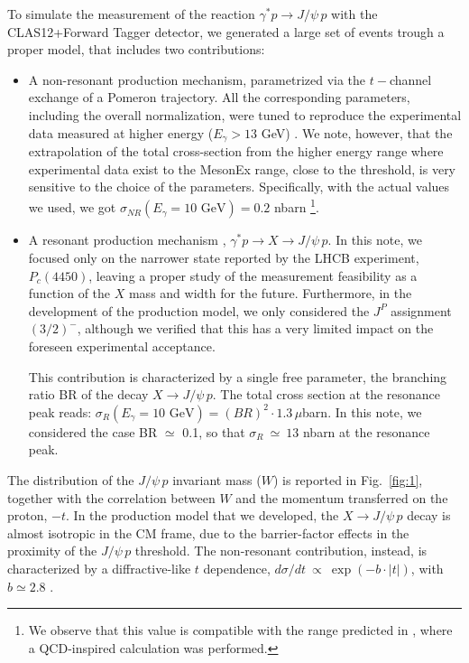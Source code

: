 To simulate the measurement of the reaction $\gamma^* p \rightarrow J/\psi \, p$ with the CLAS12+Forward Tagger detector, we generated a large set of events trough a proper model, that includes two contributions:
\begin{itemize}
\item{A non-resonant production mechanism, parametrized via the $t-$channel exchange of a Pomeron trajectory. All the corresponding parameters, including the overall normalization, were tuned to reproduce the experimental data measured at higher energy  ($E_{\gamma} > 13$ GeV) \cite{Camerini:1975cy}.
We note, however, that the extrapolation of the total cross-section from the higher energy range where experimental data exist to the MesonEx range, close to the threshold, is very sensitive to the choice of the parameters. 
Specifically, with the actual values we used, we got $\sigma_{NR}(E_{\gamma}=10 \mbox{ GeV} ) = 0.2 $ nbarn \footnote
{
We observe that this value is compatible with the range predicted in \cite{bchl}, where a QCD-inspired calculation was performed.}.
} 
\item{A resonant production mechanism  , $\gamma^* p \rightarrow X \rightarrow J/\psi \, p$. 
In this note, we focused only on the narrower state reported by the LHCB experiment, $P_c(4450)$, leaving a proper study of the measurement feasibility as a function of the $X$ mass and width for the future. 
Furthermore, in the development of the production model, we only considered the $J^P$ assignment $(3/2)^-$, although we verified that this has a very limited impact on the foreseen experimental acceptance. 

This contribution is characterized by a single free parameter, the branching ratio BR of the decay $X \rightarrow J/\psi \, p$. 
The total cross section at the resonance peak reads: $\sigma_{R}(E_{\gamma}=10 \mbox{ GeV} ) = (BR)^{2}\cdot 1.3 \, \mu$barn. 
In this note, we considered the case BR $\simeq$ 0.1, so that $\sigma_{R}~\simeq~ 13$ nbarn at the resonance peak.}
\end{itemize}

The distribution of the  $J/\psi \, p$ invariant mass ($W$) is reported in Fig.~\ref{fig:1}, together with the correlation between $W$ and the momentum transferred on the proton, $-t$. 
In the production model that we developed, the $X\rightarrow J/\psi \, p$ decay is almost isotropic in the CM frame, due to the barrier-factor effects in the proximity of the $J/\psi \, p$ threshold.
 The non-resonant contribution, instead, is characterized by a diffractive-like $t$ dependence, $d\sigma / d t~\propto~\exp(- b \cdot |t|)$, with $b\simeq 2.8$ \cite{Camerini:1975cy}.

